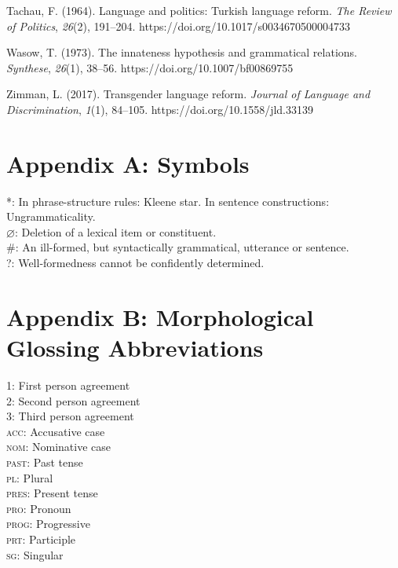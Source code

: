 \documentclass{article}
\begin{document}
\begin{thebibliography}{100}
    Tachau, F. (1964). Language and politics: Turkish language reform. \textit{The Review of Politics}, \textit{26}(2), 191–204. https://doi.org/10.1017/s0034670500004733

    Wasow, T. (1973). The innateness hypothesis and grammatical relations. \textit{Synthese}, \textit{26}(1), 38–56. https://doi.org/10.1007/bf00869755

    Zimman, L. (2017). Transgender language reform. \textit{Journal of Language and Discrimination}, \textit{1}(1), 84–105. https://doi.org/10.1558/jld.33139

\end{thebibliography}


\section*{Appendix A: Symbols}

*: In phrase-structure rules: Kleene star. In sentence constructions: Ungrammaticality. \\
$\varnothing$: Deletion of a lexical item or constituent. \\
\#: An ill-formed, but syntactically grammatical, utterance or sentence. \\
?: Well-formedness cannot be confidently determined.

\section*{Appendix B: Morphological Glossing Abbreviations}
1: First person agreement\\
2: Second person agreement\\
3: Third person agreement\\
{\scshape acc}: Accusative case\\
{\scshape nom}: Nominative case\\
{\scshape past}: Past tense \\
{\scshape pl}: Plural \\
{\scshape pres}: Present tense \\ 
{\scshape pro}: Pronoun \\
{\scshape prog}: Progressive \\
{\scshape prt}: Participle \\
{\scshape sg}: Singular \\
\end{document}
